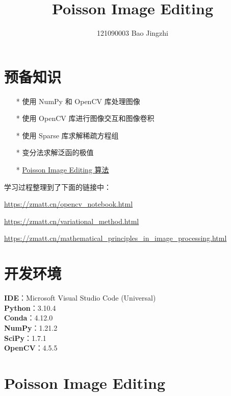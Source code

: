 \documentclass[lang=cn,11pt,a4paper]{elegantpaper}
\title{Poisson Image Editing}
\author{121090003    Bao Jingzhi}
\institute{CUHK(SZ)}
\date{\zhtoday}
\begin{document}
\maketitle

\section{预备知识}
\begin{itemize}
    \item[*] 使用 NumPy 和 OpenCV 库处理图像
    \item[*] 使用 OpenCV 库进行图像交互和图像卷积
	\item[*] 使用 Sparse 库求解稀疏方程组
    \item[*] 变分法求解泛函的极值
	\item[*] \href{https://dl.acm.org/doi/10.1145/882262.882269}{Poisson Image Editing 算法}
\end{itemize} 

\vspace{10pt}

学习过程整理到了下面的链接中：

\url{https://zmatt.cn/opencv_notebook.html}

\url{https://zmatt.cn/variational_method.html}

\url{https://zmatt.cn/mathematical_principles_in_image_processing.html}

\section{开发环境}

\noindent
\textbf{IDE}：Microsoft Visual Studio Code (Universal)\\
\textbf{Python}：3.10.4\\
\textbf{Conda}：4.12.0\\
\textbf{NumPy}：1.21.2\\
\textbf{SciPy}：1.7.1\\
\textbf{OpenCV}：4.5.5

\newpage
\section{Poisson Image Editing}
\end{document}
